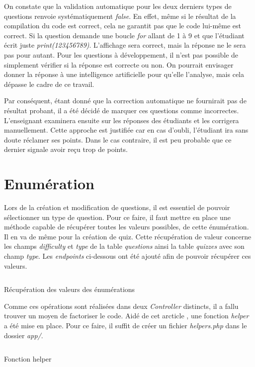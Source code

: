 On constate que la validation automatique pour les deux derniers types de questions renvoie systématiquement \emph{false}. En effet, même si le résultat de la compilation du code est correct, cela ne garantit pas que le code lui-même est correct. Si la question demande une boucle \emph{for} allant de 1 à 9 et que l'étudiant écrit juste \emph{print(123456789)}. L'affichage sera correct, mais la réponse ne le sera pas pour autant. Pour les questions à développement, il n'est pas possible de simplement vérifier si la réponse est correcte ou non. On pourrait envisager donner la réponse à une intelligence artificielle pour qu'elle l'analyse, mais cela dépasse le cadre de ce travail.

Par conséquent, étant donné que la correction automatique ne fournirait pas de résultat probant, il a été décidé de marquer ces questions comme incorrectes. L'enseignant examinera  ensuite sur les réponses des étudiants et les corrigera manuellement. Cette approche est justifiée car en cas d'oubli, l'étudiant ira sans doute réclamer ses points. Dans le cas contraire, il est peu probable que ce dernier signale avoir reçu trop de points.

\section{Enumération}
Lors de la création et modification de questions, il est essentiel de pouvoir sélectionner un type de question. Pour ce faire, il faut mettre en place une méthode capable de récupérer toutes les valeurs possibles, de cette énumération. Il en va de même pour la création de quiz. Cette récupération de valeur concerne les champs \emph{difficulty} et \emph{type} de la table \emph{questions} ainsi la table \emph{quizzes} avec son champ \emph{type}. Les \emph{endpoints} ci-dessous ont été ajouté afin de pouvoir récupérer ces valeurs.

\begin{listing}[H]
    \inputminted{php}{assets/code/enumEndpoints.php}
    \caption{Récupération des valeurs des énumérations}
\end{listing}

Comme ces opérations sont réalisées dans deux \emph{Controller} distincts, il a fallu trouver un moyen de factoriser le code. Aidé de cet arcticle \cite{HelperLaravel}, une fonction \emph{helper} a été mise en place. Pour ce faire, il suffit de créer un fichier \emph{helpers.php} dans le dossier \emph{app/}.

\begin{listing}[H]
    \inputminted{php}{assets/code/enumValues.php}
    \caption{Fonction helper}
\end{listing}

